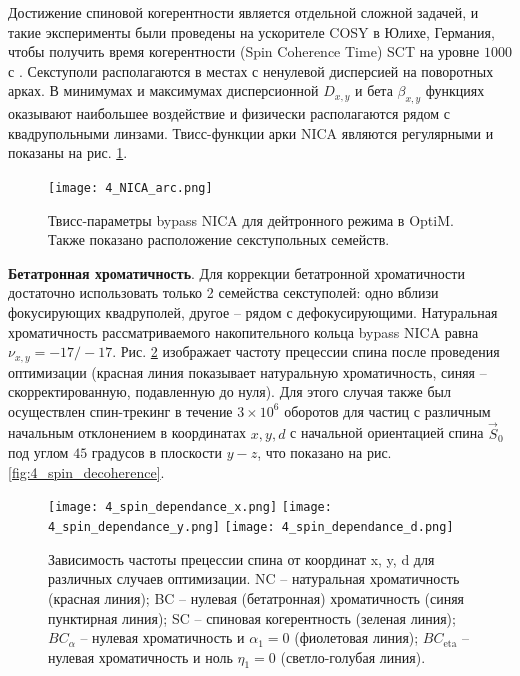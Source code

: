 \par Достижение спиновой когерентности является отдельной сложной задачей, и такие эксперименты были проведены на ускорителе COSY в Юлихе, Германия, чтобы получить время когерентности (Spin Coherence Time) SCT на уровне $1000$ с \cite{1000}. Секступоли располагаются в местах с ненулевой дисперсией на поворотных арках. В минимумах и максимумах дисперсионной $D_{x,y}$ и бета $\beta_{x,y}$ функциях оказывают наибольшее воздействие и физически располагаются рядом с квадрупольными линзами. Твисс-функции арки NICA являются регулярными и показаны на рис. \ref{fig:4_NICA_arc}.

\begin{figure}[!h]
  \centering
   \texttt{[image: 4\_NICA\_arc.png]}
   \caption{Твисс-параметры bypass NICA для дейтронного режима в OptiM. Также показано расположение секступольных семейств.}
   \label{fig:4_NICA_arc}
\end{figure}

\textbf{Бетатронная хроматичность}.
Для коррекции бетатронной хроматичности достаточно использовать только 2 семейства секступолей: одно вблизи фокусирующих квадруполей, другое – рядом с дефокусирующими. Натуральная хроматичность рассматриваемого накопительного кольца bypass NICA равна $\nu_{x,y}=-17/-17$. Рис. \ref{fig:4_spin_dependance}  изображает частоту прецессии спина после проведения оптимизации (красная линия показывает натуральную хроматичность, синяя – скорректированную, подавленную до нуля). Для этого случая также был осуществлен спин-трекинг в течение $3\times{10}^6$ оборотов для частиц с различным начальным отклонением в координатах $x, y, d$ с начальной ориентацией спина ${\vec{S}}_0$ под углом $45$ градусов в плоскости $y-z$, что показано на рис. \ref{fig:4_spin_decoherence}.

\begin{figure}[!h]
	\centering
	\texttt{[image: 4\_spin\_dependance\_x.png]}
	\texttt{[image: 4\_spin\_dependance\_y.png]}
	\texttt{[image: 4\_spin\_dependance\_d.png]}
	\caption{Зависимость частоты прецессии спина от координат x, y, d для различных случаев оптимизации. NC – натуральная хроматичность (красная линия); BC – нулевая (бетатронная) хроматичность (синяя пунктирная линия); SC – спиновая когерентность (зеленая линия); $BC_{\alpha}$ – нулевая хроматичность и $\alpha_1=0$ (фиолетовая линия); $BC_{\text{eta}}$ – нулевая хроматичность и ноль $\eta_1=0$ (светло-голубая линия).}
	\label{fig:4_spin_dependance}
\end{figure}

